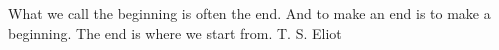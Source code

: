 What we call the beginning is often the end. And to make an end is to make a beginning. The end is where we start from. T. S. Eliot
